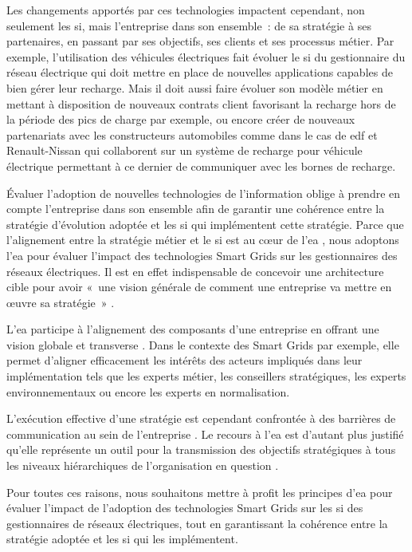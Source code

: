 Les changements apportés par ces technologies impactent cependant, non seulement 
les \gls{si}, mais l'entreprise dans son ensemble~: de sa stratégie à ses partenaires, 
en passant par ses objectifs, ses clients et ses processus métier. Par exemple, 
l'utilisation des véhicules électriques fait évoluer le \gls{si} du 
gestionnaire du réseau électrique qui doit mettre en place de nouvelles 
applications capables de bien gérer leur recharge. Mais il doit aussi faire 
évoluer son modèle métier en mettant à disposition de nouveaux contrats 
client favorisant la recharge hors de la période des pics de charge par exemple, 
ou encore créer de nouveaux partenariats avec les constructeurs 
automobiles comme dans le cas de \gls{edf} et Renault-Nissan qui collaborent sur un 
système de recharge pour véhicule électrique permettant à ce dernier de 
communiquer avec les bornes de recharge.

Évaluer l'adoption de nouvelles technologies de l'information oblige à prendre 
en compte l'entreprise dans son ensemble afin de garantir une cohérence entre 
la stratégie d'évolution adoptée et les \gls{si} qui implémentent cette 
stratégie. Parce que l'alignement entre la stratégie métier et le \gls{si} est 
au cœur de l'\gls{ea} \cite{zachman1997enterprise}, nous
adoptons l'\gls{ea} pour évaluer l'impact des technologies Smart Grids sur les
gestionnaires des réseaux électriques. Il est en effet indispensable de
concevoir une architecture cible pour avoir  «~une vision générale de comment
une entreprise va mettre en œuvre sa stratégie~» \cite{ross2006enterprise}.

L'\gls{ea} participe à l'alignement des composants d'une entreprise en offrant une 
vision globale et transverse \cite{zachman1987framework}. Dans le contexte des 
Smart Grids par exemple, elle permet d'aligner efficacement les intérêts des 
acteurs impliqués dans leur implémentation tels que les experts métier, les 
conseillers stratégiques, les experts environnementaux ou encore les experts en 
normalisation.

L'exécution effective d'une stratégie est cependant confrontée à des barrières 
de communication au sein de l'entreprise \cite{vcater2010factors}. Le recours à 
l'\gls{ea} est d'autant plus justifié qu'elle représente un outil pour la transmission 
des objectifs stratégiques à tous les niveaux hiérarchiques de l'organisation en 
question \cite{kappelman2008enterprise}. 

Pour toutes ces raisons, nous souhaitons mettre à profit les principes d'\gls{ea} pour 
évaluer l'impact de l'adoption des technologies Smart Grids sur les \gls{si} des 
gestionnaires de réseaux électriques, tout en garantissant la cohérence entre la 
stratégie adoptée et les \gls{si} qui les implémentent. 

